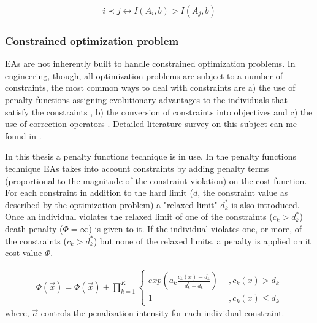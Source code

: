 \begin{eqnarray}
   i\prec j \leftrightarrow I(A_i,b) > I(A_j,b)
\end{eqnarray}    


\subsubsection{Constrained optimization problem}
EAs are not inherently built to handle constrained optimization problems. In engineering, though, all optimization problems are subject to a number of constraints, the most common ways to deal with constraints are a) the use of penalty functions \cite{Deb00,morales98} assigning evolutionary advantages to the individuals that satisfy the constraints \cite{powell93}, b) the conversion of constraints into objectives \cite{surry95,surry97} and c) the use of correction operators \cite{mich94}. Detailed literature survey on this subject can me found in \cite{mich96,coello02}.

In this thesis a penalty functions technique is in use. In the penalty functions technique EAs takes into account constraints by adding penalty terms (proportional to the magnitude of the constraint violation) on the cost function. For each constraint in addition to the hard limit ($d$, the constraint value as described by the optimization problem) a "relaxed limit" $d_k^*$ is also introduced. Once an individual violates the relaxed limit of one of the constraints ($c_k>d_k^*$) death penalty ($\Phi = \infty$) is given to it. If the individual violates one, or more, of the constraints ($c_k>d_k^*$) but none of the relaxed limits, a penalty is applied on it cost value $\Phi$. 

\begin{eqnarray}
	\Phi(\vec{x})=\Phi(\vec{x})+ \prod _{k=1}^K{\left\{ 				\begin{array}{ll}
    exp(a_k\frac{c_k(x)-d_k}{d_k^* -d_k}) & ~~,c_k(x)>d_k\\
    1 & ~~,c_k(x)\leq d_k\end{array} \right. }
    \label{penal2}
\end{eqnarray}  
where, $\vec{a}$ controls the penalization intensity for each individual constraint.

